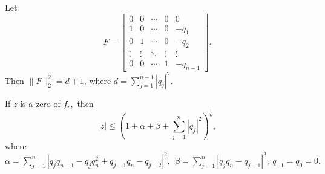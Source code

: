 \documentclass[10pt,a4paper]{amsart}
\begin{document}
\begin{lemma}{\label{lemma 2}}
    Let 
    \[F = 
\begin{bmatrix}
0 & 0 & \cdots & 0 & 0 \\
1 & 0 & \cdots & 0 & -q_{1} \\
0 & 1 & \cdots & 0 & -q_{2} \\
\vdots & \vdots & \ddots & \vdots & \vdots \\
0 & 0 & \cdots & 1 & -q_{n-1}
\end{bmatrix}.\]
Then $\|F\|^{2}_{2}=d+1$, where $d=\sum\limits_{j=1}^{n-1}|q_{j}|^{2}.$
\end{lemma}

\begin{theorem}
    If $z$ is a zero of $f_{r},$ then\\
    $$|z|\le \left(1+\alpha+\beta+\sum_{j=1}^{n}|q_{j}|^{2}\right)^\frac{1}{6},$$
    where $\alpha=\sum_{j=1}^{n}|q_{j}q_{n-1}-q_{j}q^{2}_{n}+q_{j-1}q_{n}-q_{j-2}|^{2},~~\beta=\sum_{j=1}^{n}|q_{j}q_{n}-q_{j-1}|^{2},~ q_{-1}=q_{0}=0.$ 
\end{theorem}
\end{document}
